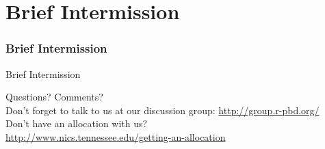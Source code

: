 \section[Break]{Brief Intermission}
\hidenum
\begin{frame}[noframenumbering]
\frametitle{Brief Intermission}
  \begin{block}{Brief Intermission}
  \begin{center}
     {\Large Questions?  Comments?}\\[.4cm]
     Don't forget to talk to us at our discussion group: \url{http://group.r-pbd.org/}\\[.4cm]
     Don't have an allocation with us?  \\
     \url{http://www.nics.tennessee.edu/getting-an-allocation}
  \end{center}
  \end{block}
\end{frame}
\shownum

